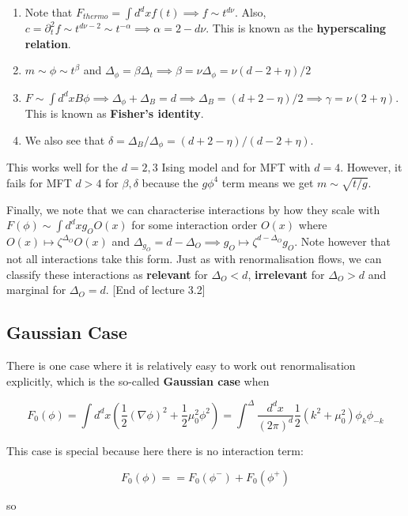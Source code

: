 \documentclass{article}
\theoremstyle{definition}
\begin{document}
\begin{enumerate}
  \item Note that $F_{thermo} = \int d^d x f(t) \implies f \sim t^{d\nu}$. Also,
    $c = \partial_t^2 f \sim t^{d\nu - 2} \sim t^{-\alpha} \implies \alpha = 2 -
    d\nu$. This is known as the \textbf{hyperscaling relation}.
  \item $m \sim \phi \sim t^\beta$ and $\Delta_\phi = \beta \Delta_t \implies
    \beta = \nu \Delta_\phi = \nu (d - 2 + \eta) / 2$
  \item $F \sim \int d^d x B\phi \implies \Delta_\phi + \Delta_B = d \implies
    \Delta_B = (d + 2 - \eta) / 2 \implies \gamma = \nu(2 + \eta)$. This is
    known as \textbf{Fisher's identity}.
  \item We also see that $\delta = \Delta_B / \Delta_\phi = (d + 2 - \eta) / (d
    - 2 + \eta)$.
\end{enumerate}

This works well for the $d=2, 3$ Ising model and for MFT with $d = 4$. However,
it fails for MFT $d > 4$ for $\beta, \delta$ because the $g \phi^4$ term means
we get $m \sim \sqrt{t / g}$. 

Finally, we note that we can characterise interactions by how they scale with
$F(\phi) \sim \int d^d x g_O O(x)$ for some interaction order $O(x)$ where $O(x)
\mapsto \zeta^{\Delta_O} O(x)$ and $\Delta_{g_O} = d - \Delta_O \implies g_O
\mapsto \zeta^{d - \Delta_O} g_O$. Note however that not all interactions take
this form. Just as with renormalisation flows, we can classify these
interactions as \textbf{relevant} for $\Delta_O < d$, \textbf{irrelevant} for
$\Delta_O > d$ and marginal for $\Delta_O = d$. [End of lecture 3.2]

\subsection{Gaussian Case}

There is one case where it is relatively easy to work out renormalisation
explicitly, which is the so-called \textbf{Gaussian case} when

$$ F_0(\phi) = \int d^d x \left( \frac{1}{2}(\nabla \phi)^2 + \frac{1}{2}
  \mu_0^2 \phi^2 \right) = \int^\Delta \frac{d^d x}{(2\pi)^d} \frac{1}{2}(k^2 +
\mu_0^2) \phi_k \phi_{-k} $$

This case is special because here there is no interaction term:

$$ F_0(\phi)= = F_0(\phi^-) + F_0(\phi^+) $$

so
\end{document}
